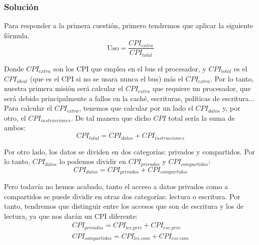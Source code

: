 \documentclass[12pt,a4paper]{article}
\begin{document}
\subsubsection{Solución}
Para responder a la primera cuestión, primero tendremos que aplicar la siguiente fórmula.
\begin{equation}
\text{Uso}=\frac{CPI_{extra}}{CPI_{total}}
\end{equation}

Donde $CPI_{extra}$ son los CPI que emplea en el bus el procesador, y $CPI_{total}$ es el $CPI_{ideal}$ (que es el CPI si no se usara nunca el bus) más el $CPI_{extra}$. Por lo tanto, nuestra primera misión será calcular el $CPI_{extra}$ que requiere un procesador, que será debido principalmente a fallos en la caché, escrituras, políticas de escritura...\\

Para calcular el $CPI_{extra}$, tenemos que calcular por un lado el $CPI_{datos}$ y, por otro, el $CPI_{instrucciones}$. De tal manera que dicho $CPI$ total sería la suma de ambos:
\begin{equation}
CPI_{total}=CPI_{datos}+CPI_{instrucciones}
\end{equation}

Por otro lado, los datos se dividen en dos categorías: privados y compartidos. Por lo tanto, $CPI_{datos}$ lo podemos dividir en $CPI_{privados}$ y $CPI_{compartidos}$:
\begin{equation}
CPI_{datos}=CPI_{privados}+CPI_{compartidos}
\end{equation}

Pero todavía no hemos acabado, tanto el acceso a datos privados como a compartidos se puede dividir en otras dos categorías: lectura o escritura. Por tanto, tendremos que distinguir entre los accesos que son de escritura y los de lectura, ya que nos darán un CPI diferente:
\begin{align}
CPI_{privados}=CPI_{lec.priv}+CPI_{esc.priv}\\
CPI_{compartidos}=CPI_{lec.com}+CPI_{esc.com}
\end{align}
\end{document}

